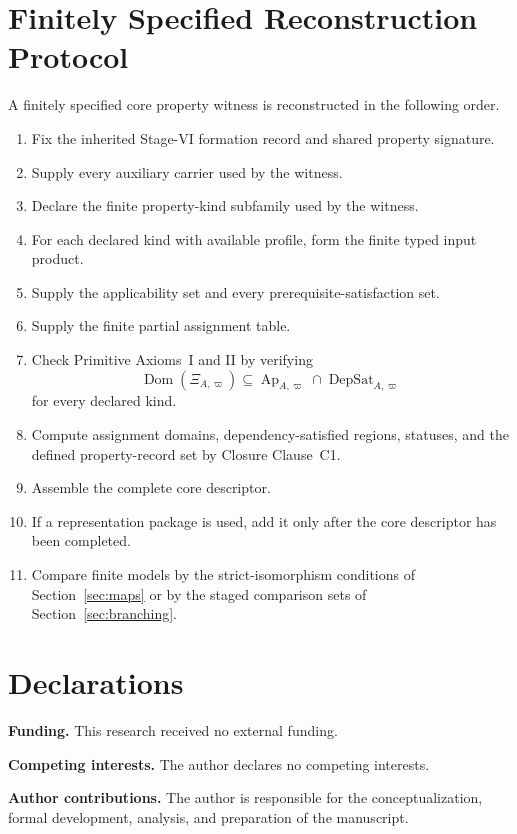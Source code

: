 \documentclass[11pt]{article}
\newcommand{\Ap}{\operatorname{Ap}}
\newcommand{\DepSat}{\operatorname{DepSat}}
\newcommand{\Dom}{\operatorname{Dom}}
\theoremstyle{definition}
\theoremstyle{remark}
\begin{document}
\section{Finitely Specified Reconstruction Protocol}
\label{app:finite-protocol}

A finitely specified core property witness is reconstructed in the following order.
\begin{enumerate}
\item Fix the inherited Stage-VI formation record and shared property signature.
\item Supply every auxiliary carrier used by the witness.
\item Declare the finite property-kind subfamily used by the witness.
\item For each declared kind with available profile, form the finite typed input product.
\item Supply the applicability set and every prerequisite-satisfaction set.
\item Supply the finite partial assignment table.
\item Check Primitive Axioms~I and II by verifying
\[
\Dom(\Xi_{A,\varpi})
\subseteq
\Ap_{A,\varpi}\cap\DepSat_{A,\varpi}
\]
for every declared kind.
\item Compute assignment domains, dependency-satisfied regions, statuses, and the defined property-record set by Closure Clause~C1.
\item Assemble the complete core descriptor.
\item If a representation package is used, add it only after the core descriptor has been completed.
\item Compare finite models by the strict-isomorphism conditions of Section~\ref{sec:maps} or by the staged comparison sets of Section~\ref{sec:branching}.
\end{enumerate}

\section*{Declarations}

\noindent\textbf{Funding.} This research received no external funding.

\noindent\textbf{Competing interests.} The author declares no competing interests.

\noindent\textbf{Author contributions.} The author is responsible for the conceptualization, formal development, analysis, and preparation of the manuscript.
\end{document}
